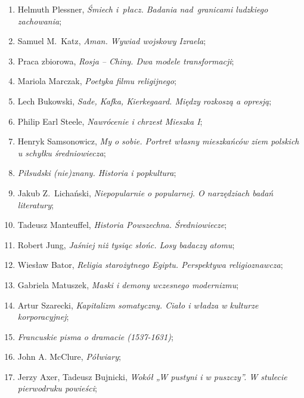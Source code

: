 \documentclass[a4paper,11pt]{article}
\begin{document}
\begin{enumerate}
\item Helmuth Plessner, \textit{Śmiech i~płacz. Badania nad~granicami
    ludzkiego zachowania};

\item Samuel M.~Katz, \textit{Aman. Wywiad wojskowy Izraela};

\item Praca zbiorowa, \textit{Rosja -- Chiny. Dwa modele transformacji};

\item Mariola Marczak, \textit{Poetyka filmu religijnego};

\item Lech Bukowski, \textit{Sade, Kafka, Kierkegaard. Między rozkoszą a
    opresją};

\item Philip Earl Steele, \textit{Nawrócenie i chrzest Mieszka I};

\item Henryk Samsonowicz, \textit{My o sobie. Portret własny mieszkańców
    ziem polskich u schyłku średniowiecza};

\item \textit{Piłsudski (nie)znany. Historia i popkultura};

\item Jakub Z.~Lichański, \textit{Niepopularnie o popularnej. O
    narzędziach badań literatury};

\item Tadeusz Manteuffel, \textit{Historia Powszechna. Średniowiecze};

\item Robert Jung, \textit{Jaśniej niż tysiąc słońc. Losy badaczy
    atomu};

\item Wiesław Bator, \textit{Religia starożytnego Egiptu. Perspektywa
    religioznawcza};

\item Gabriela Matuszek, \textit{Maski i demony wczesnego modernizmu};

\item Artur Szarecki, \textit{Kapitalizm somatyczny. Ciało i władza w
    kulturze korporacyjnej};

\item \textit{Francuskie pisma o dramacie (1537-1631)};

\item John A. McClure, \textit{Półwiary};

\item Jerzy Axer, Tadeusz Bujnicki, \textit{Wokół „W pustyni i w
    puszczy”. W stulecie pierwodruku powieści};


\end{enumerate}
\end{document}
